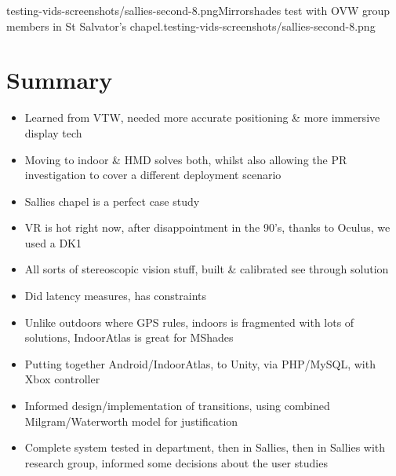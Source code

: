        {testing-vids-screenshots/sallies-second-8.png}{Mirrorshades test with OVW group members in St Salvator's chapel.}{testing-vids-screenshots/sallies-second-8.png}


\section{Summary}
\begin{itemize}
	\item Learned from VTW, needed more accurate positioning \& more immersive display tech
	\item Moving to indoor \& HMD solves both, whilst also allowing the PR investigation to cover a different deployment scenario
	\item Sallies chapel is a perfect case study
	\item VR is hot right now, after disappointment in the 90's, thanks to Oculus, we used a DK1
	\item All sorts of stereoscopic vision stuff, built \& calibrated see through solution
	\item Did latency measures, has constraints
	\item Unlike outdoors where GPS rules, indoors is fragmented with lots of solutions, IndoorAtlas is great for MShades
	\item Putting together Android/IndoorAtlas, to Unity, via PHP/MySQL, with Xbox controller
	\item Informed design/implementation of transitions, using combined Milgram/Waterworth model for justification
	\item Complete system tested in department, then in Sallies, then in Sallies with research group, informed some decisions about the user studies
\end{itemize}


